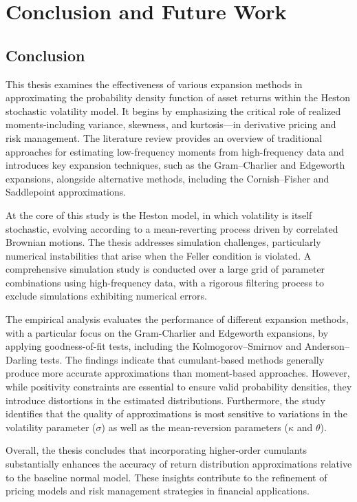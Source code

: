 \chapter{Conclusion and Future Work}
\label{sec:conclusion_future_work}

\section{Conclusion}

This thesis examines the effectiveness of various expansion methods in approximating the probability density function of asset returns within the Heston stochastic volatility model. It begins by emphasizing the critical role of realized moments-including variance, skewness, and kurtosis—in derivative pricing and risk management. The literature review provides an overview of traditional approaches for estimating low-frequency moments from high-frequency data and introduces key expansion techniques, such as the Gram–Charlier and Edgeworth expansions, alongside alternative methods, including the Cornish–Fisher and Saddlepoint approximations.

At the core of this study is the Heston model, in which volatility is itself stochastic, evolving according to a mean-reverting process driven by correlated Brownian motions. The thesis addresses simulation challenges, particularly numerical instabilities that arise when the Feller condition is violated. A comprehensive simulation study is conducted over a large grid of parameter combinations using high-frequency data, with a rigorous filtering process to exclude simulations exhibiting numerical errors.

The empirical analysis evaluates the performance of different expansion methods, with a particular focus on the Gram-Charlier and Edgeworth expansions, by applying goodness-of-fit tests, including the Kolmogorov–Smirnov and Anderson–Darling tests. The findings indicate that cumulant-based methods generally produce more accurate approximations than moment-based approaches. However, while positivity constraints are essential to ensure valid probability densities, they introduce distortions in the estimated distributions. Furthermore, the study identifies that the quality of approximations is most sensitive to variations in the volatility parameter ($\sigma$) as well as the mean-reversion parameters ($\kappa$ and $\theta$).

Overall, the thesis concludes that incorporating higher-order cumulants substantially enhances the accuracy of return distribution approximations relative to the baseline normal model. These insights contribute to the refinement of pricing models and risk management strategies in financial applications.

